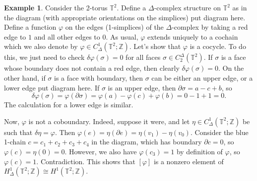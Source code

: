 \documentclass{book}
\newcommand{\bbT}{\mathbb{T}}
\newcommand{\bbZ}{\mathbb{Z}}
\renewcommand{\phi}{\varphi}
\theoremstyle{definition}
\newtheorem{example}[theorem]{Example}
\theoremstyle{remark}
\numberwithin{equation}{section}
\begin{document}
\begin{example}
    Consider the 2-torus $\bbT^2$. Define a $\Delta$-complex structure on $\bbT^2$ as in the diagram (with appropriate orientations on the simplices) {\color{red} put diagram here}. Define a function $\phi$ on the edges (1-simplices) of the $\Delta$-complex by taking a red edge to $1$ and all other edges to $0$. As usual, $\phi$ extends uniquely to a cochain which we also denote by $\phi \in C^1_\Delta(\bbT^2;\bbZ)$. Let's show that $\phi$ is a cocycle. To do this, we just need to check $\delta\phi(\sigma) = 0$ for all faces $\sigma \in C_2^\Delta(\bbT^2)$. If $\sigma$ is a face whose boundary does not contain a red edge, then clearly $\delta\phi(\sigma) = 0$. On the other hand, if $\sigma$ is a face with boundary, then $\sigma$ can be either an upper edge, or a lower edge {\color{red} put diagram here}. If $\sigma$ is an upper edge, then $\partial\sigma = a - c + b$, so
    \begin{equation}
        \delta\phi(\sigma) = \phi(\partial\sigma) = \phi(a) - \phi(c) + \phi(b) = 0 - 1 + 1 = 0.
    \end{equation}
    The calculation for a lower edge is similar.

    Now, $\phi$ is not a coboundary. Indeed, suppose it were, and let $\eta \in C_\Delta^1(\bbT^2;\bbZ)$ be such that $\delta\eta = \phi$. Then $\phi(e) = \eta(\partial e) = \eta(v_1) - \eta(v_0)$. Consider the blue 1-chain $c = c_1 + c_2 + c_3 + c_4$ in the diagram, which has boundary $\partial c = 0$, so $\phi(c) = \eta(0) = 0$. However, we also have $\phi(c_3) = 1$ by definition of $\phi$, so $\phi(c) = 1$. Contradiction. This shows that $[\phi]$ is a nonzero element of $H_\Delta^1(\bbT^2;\bbZ) \cong H^1(\bbT^2;\bbZ)$.


\end{example}
\end{document}
